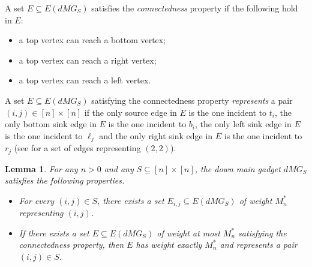\documentclass[a4paper,11pt]{article}
\theoremstyle{plain}
\newtheorem{lemma}[theorem]{Lemma}
\newtheorem{identification rule}{Identification Rule}
\theoremstyle{definition}
\theoremstyle{remark}
\begin{document}
\noindent
A set $E \subseteq E(dMG_S)$ satisfies the \emph{connectedness} property if the following hold in $E$: 
\begin{itemize}
\item a top vertex can reach a bottom vertex;
\item a top vertex can reach a right vertex; 
\item a top vertex can reach a left vertex.
\end{itemize}
A set $E \subseteq E(dMG_S)$ satisfying the connectedness property \emph{represents} a pair $(i,j) \in [n] \times [n]$ if the only source edge in $E$ is the one incident to $t_i$, the only bottom sink edge in $E$ is the one incident to $b_i$, the only left sink edge in $E$ is the one incident to $\ell_j$ and the only right sink edge in $E$ is the one incident to $r_j$ (see  for a set of edges representing $(2,2)$).

\begin{lemma}
\label{lem:dmg}
For any $n > 0$ and any $S \subseteq [n] \times [n]$, the down main gadget $dMG_S$ satisfies the following properties.
\begin{itemize}
\item[(1)] For every $(i,j) \in S$, there exists a set $E_{i,j} \subseteq E(dMG_S)$ of weight $M_n^*$ representing $(i,j)$.
\item[(2)] If there exists a set $E \subseteq E(dMG_S)$ of weight at most $M_n^*$ satisfying the connectedness property, then $E$ has weight exactly $M_n^*$ and represents a pair $(i,j) \in S$.
\end{itemize}
\end{lemma}
\end{document}
